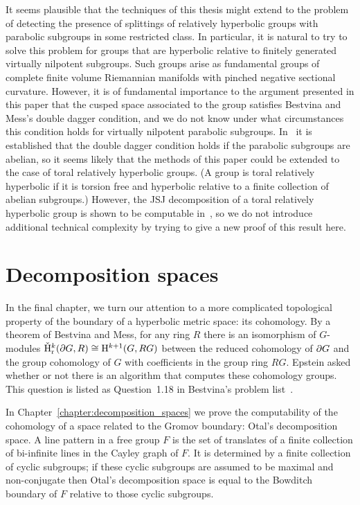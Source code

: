It seems plausible that the techniques of this thesis might extend to the problem of detecting the presence of splittings of relatively hyperbolic groups with parabolic subgroups in some restricted class. 
In particular, it is natural to try to solve this problem for groups that are hyperbolic relative to finitely generated virtually nilpotent subgroups. 
Such groups arise as fundamental groups of complete finite volume Riemannian manifolds with pinched negative sectional curvature. 
However, it is of fundamental importance to the argument presented in this paper that the cusped space associated to the group satisfies Bestvina and Mess's double dagger condition, and we do not know under what circumstances this condition holds for virtually nilpotent parabolic subgroups. 
In~\cite{dahmanigroves08a} it is established that the double dagger condition holds if the parabolic subgroups are abelian, so it seems likely that the methods of this paper could be extended to the case of toral relatively hyperbolic groups. 
(A group is toral relatively hyperbolic if it is torsion free and hyperbolic relative to a finite collection of abelian subgroups.) 
However, the JSJ decomposition of a toral relatively hyperbolic group is shown to be computable in~\cite{dahmanitouikan13}, so we do not introduce additional technical complexity by trying to give a new proof of this result here.

\section{Decomposition spaces}

In the final chapter, we turn our attention to a more complicated topological property of the boundary of a hyperbolic metric space: its \vCech{} cohomology.
By a theorem of Bestvina and Mess, for any ring $R$ there is an isomorphism of $G$-modules $\check{\mathrm{H}}{}^k_{\mathrm{r}}(\partial G, R) \cong \mathrm{H}{}^{k+1}(G, RG)$ between the reduced \vCech{} cohomology of $\partial G$ and the group cohomology of $G$ with coefficients in the group ring $RG$.
Epstein asked whether or not there is an algorithm that computes these cohomology groups.
This question is listed as Question~1.18{} in Bestvina's problem list~\cite{bestvina}.

In Chapter~\ref{chapter:decomposition_spaces} we prove the computability of the \vCech{} cohomology of a space related to the Gromov boundary: Otal's decomposition space.
A line pattern in a free group $F$ is the set of translates of a finite collection of bi-infinite lines in the Cayley graph of $F$.
It is determined by a finite collection of cyclic subgroups; if these cyclic subgroups are assumed to be maximal and non-conjugate then Otal's decomposition space is equal to the Bowditch boundary of $F$ relative to those cyclic subgroups.

